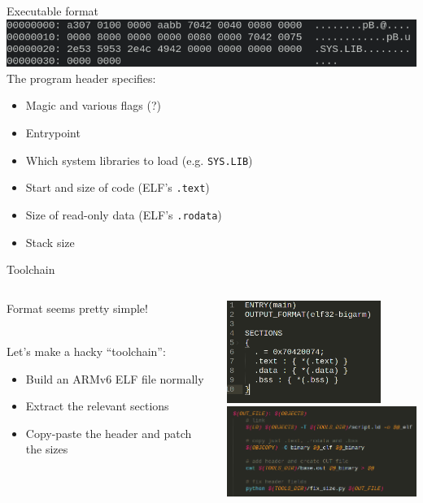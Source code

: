 \documentclass[12pt,aspectratio=169]{beamer}
\begin{document}
\begin{frame}{Executable format}
\includegraphics[width=\textwidth]{media/executable_format_xxd}
The program header specifies:
~\\
\begin{itemize}
	\item Magic and various flags (?)
	\item Entrypoint
	\item Which system libraries to load (e.g. \texttt{SYS.LIB})
	\item Start and size of code (ELF's \texttt{.text})
	\item Size of read-only data (ELF's \texttt{.rodata})
	\item Stack size
\end{itemize}
\end{frame}

\begin{frame}{Toolchain}
\begin{columns}
	\begin{column}{0.5\textwidth}
		Format seems pretty simple!

		\pause
		~\\
		Let's make a hacky ``toolchain'':
		\begin{itemize}
			\item Build an ARMv6 ELF file normally
			\item Extract the relevant sections
			\item Copy-paste the header and patch the sizes
		\end{itemize}
	\end{column}
	\begin{column}{0.5\textwidth}
		\includegraphics[width=5cm]{media/linker_script}\\
		\includegraphics[width=7cm]{media/hacky_toolchain}
	\end{column}
\end{columns}
\end{frame}
\end{document}

